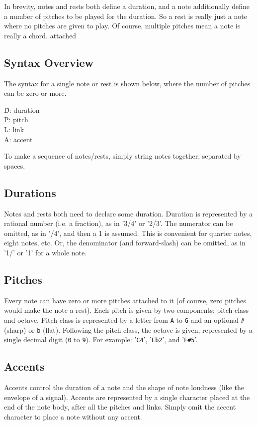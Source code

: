 \documentclass{scrartcl}
\begin{document}
In brevity, notes and rests both define a duration, and a note additionally define a number of pitches to be played for the duration. So a rest is really just a note where no pitches are given to play. Of course, multiple pitches mean a note is really a chord.
attached
\subsection{Syntax Overview}
The syntax for a single note or rest is shown below, where the number of pitches can be zero or more.
\begin{center}
   
\end{center}
\begin{tabbing}
  \hspace{1.85in}\= D: duration \\
  \> P: pitch \\
  \> L: link \\
  \> A: accent \\
\end{tabbing}
To make a sequence of notes/rests, simply string notes together, separated by spaces.

\subsection{Durations}
Notes and rests both need to declare some duration. Duration is represented by a rational number (i.e. a fraction), as in '3/4' or '2/3'. The numerator can be omitted, as in '/4', and then a 1 is assumed. This is convenient for quarter notes, eight notes, etc. Or, the denominator (and forward-slash) can be omitted, as in '1/' or '1' for a whole note.

\subsection{Pitches}
Every note can have zero or more pitches attached to it (of course, zero pitches would make the note a rest). Each pitch is given by two components: pitch class and octave. Pitch class is represented by a letter from \verb|A| to \verb|G| and an optional \verb|#| (sharp) or \verb|b| (flat). Following the pitch class, the octave is given, represented by a single decimal digit (\verb|0| to \verb|9|). For example: '\verb|C4|', '\verb|Eb2|', and '\verb|F#5|'.

\subsection{Accents}
Accents control the duration of a note and the shape of note loudness (like the envelope of a signal). Accents are represented by a single character placed at the end of the note body, after all the pitches and links. Simply omit the accent character to place a note without any accent.
\end{document}
